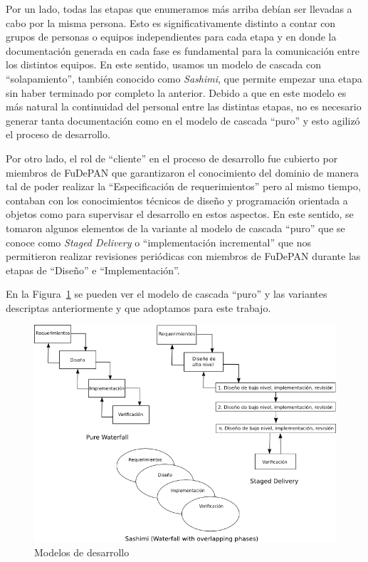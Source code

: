 Por un lado, todas las etapas que enumeramos m\'as arriba deb\'ian ser llevadas
a cabo por la misma persona. Esto es significativamente distinto a contar con
grupos de personas o equipos independientes para cada etapa y en donde la
documentaci\'on generada en cada fase es fundamental para la comunicaci\'on
entre los distintos equipos. En este sentido, usamos un modelo de cascada con
``solapamiento'', tambi\'en conocido como \textit{Sashimi}\cite{Mcconnell96},
que permite empezar una etapa sin haber terminado por completo la anterior.
Debido a que en este modelo es m\'as natural la continuidad del personal entre
las distintas etapas, no es necesario generar tanta documentaci\'on como en el
modelo de cascada ``puro'' y esto agiliz\'o el proceso de desarrollo.

Por otro lado, el rol de ``cliente'' en el proceso de desarrollo fue cubierto
por miembros de \ac{FuDePAN} que garantizaron el conocimiento del dominio de
manera tal de poder realizar la ``Especificaci\'on de requerimientos'' pero al
mismo tiempo, contaban con los conocimientos t\'ecnicos de dise\~no y
programaci\'on orientada a objetos como para supervisar el desarrollo en estos
aspectos. En este sentido, se tomaron algunos elementos de la variante al modelo
de cascada ``puro'' que se conoce como \textit{Staged
Delivery}\cite{Mcconnell96} o ``implementaci\'on incremental'' que nos
permitieron realizar revisiones peri\'odicas con miembros de \ac{FuDePAN}
durante las etapas de ``Dise\~no'' e ``Implementaci\'on''.

En la Figura~\ref{modelos} se pueden ver el modelo de cascada ``puro'' y las
variantes descriptas anteriormente y que adoptamos para este trabajo.

\begin{figure}
 \centering
  \includegraphics[scale=0.6]{modelos}
  \caption{Modelos de desarrollo}
  \label{modelos}
\end{figure}


